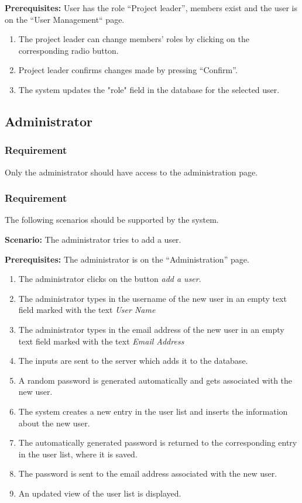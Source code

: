 \documentclass{article}
\begin{document}
\textbf{Prerequisites:} User has the role “Project leader”, members exist and the user is on the “User Management“ page.

\begin{enumerate}
    \item The project leader can change members' roles by clicking on the corresponding radio button.
    \item Project leader confirms changes made by pressing “Confirm”.
    \item The system updates the "role" field in the database for the selected user.
    
\end{enumerate}


\subsection{Administrator}


\subsubsection{Requirement}
Only the administrator should have access to the administration page.


\subsubsection{Requirement}
The following scenarios should be supported by the system.

\textbf{Scenario:} The administrator tries to add a user.

\textbf{Prerequisites:} The administrator is on the “Administration” page.

\begin{enumerate}
    \item The administrator clicks on the button \emph{add a user}.
    \item The administrator types in the username of the new user in an empty text field marked with the text \emph{User Name}
    \item The administrator types in the email address of the new user in an empty text field marked with the text \emph{Email Address}
    \item The inputs are sent to the server which adds it to the database.
    \item A random password is generated automatically and gets associated with the new user.
    \item The system creates a new entry in the user list and inserts the information about the new user.
    \item The automatically generated password is returned to the corresponding entry in the user list, where it is saved.
    \item The password is sent to the email address associated with the new user.
    \item An updated view of the user list is displayed.
\end{enumerate}
\end{document}
